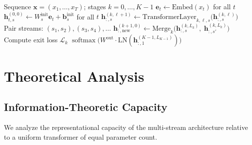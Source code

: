 \documentclass[11pt,a4paper]{article}
\theoremstyle{definition}
\theoremstyle{plain}
\theoremstyle{remark}
\newcommand{\Lcal}{\mathcal{L}}
\newcommand{\softmax}{\operatorname{softmax}}
\begin{document}
\begin{algorithm}[h]
\caption{Felix-LM Forward Pass}\label{alg:forward}
\begin{algorithmic}[1]
\Require Sequence $\mathbf{x} = (x_1, \ldots, x_T)$; stages 
  $k = 0, \ldots, K{-}1$
\State $\mathbf{e}_t \gets \text{Embed}(x_t)$ for all $t$
 
  \State $\mathbf{h}_{t,s}^{(0,0)} \gets W_s^{\text{init}} 
    \mathbf{e}_t + \mathbf{b}_s^{\text{init}}$ for all $t$
\EndFor
{} 
   
     
      \State $\mathbf{h}_{:,s}^{(k,\ell+1)} \gets 
        \text{TransformerLayer}_{k,\ell,s}\bigl(
        \mathbf{h}_{:,s}^{(k,\ell)}\bigr)$ 
    \EndFor
  \EndFor
   
    \State Pair streams: $(s_1, s_2), (s_3, s_4), \ldots$
      \State $\mathbf{h}_{:,\text{new}}^{(k+1, 0)} \gets 
        \text{Merge}_k\bigl(\mathbf{h}_{:,s}^{(k,L_k)},\; 
        \mathbf{h}_{:,s'}^{(k,L_k)}\bigr)$ 
    \EndFor
    \State Compute exit loss $\Lcal_k$ 
  \EndIf
\EndFor
\State \Return $\softmax\bigl(W^{\text{out}} \cdot 
  \text{LN}(\mathbf{h}_{:,1}^{(K-1, L_{K-1})})\bigr)$
\end{algorithmic}
\end{algorithm}

\section{Theoretical Analysis}\label{sec:theory}

\subsection{Information-Theoretic Capacity}\label{sec:info-theory}

We analyze the representational capacity of the multi-stream architecture 
relative to a uniform transformer of equal parameter count.
\end{document}
